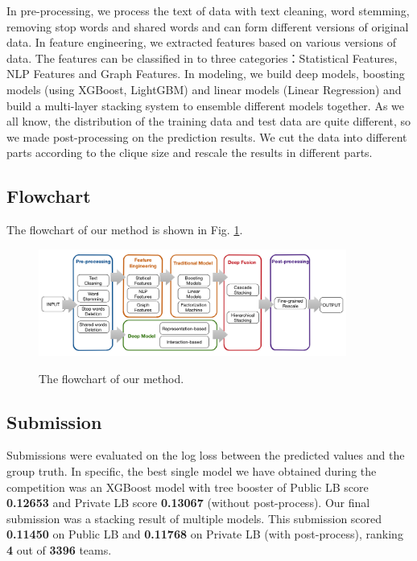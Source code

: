 \documentclass[12pt]{article}
\begin{document}
In pre-processing, we process the text of data with text cleaning, word stemming, removing stop words and shared words and can form different versions of original data. In feature engineering, we extracted features based on various versions of data. The features can be classified in to three categories：Statistical Features, NLP Features and Graph Features. In modeling, we build deep models, boosting models (using XGBoost, LightGBM) and linear models (Linear Regression) and build a multi-layer stacking system to ensemble different models together. As we all know, the distribution of the training data and test data are quite different, so we made post-processing on the prediction results. We cut the data into different parts according to the clique size and rescale the results in different parts. 

\subsection{Flowchart}

The flowchart of our method is shown in Fig. \ref{fig:Flowchart}.

\begin{figure}[ht]
  \centering
  \includegraphics[width=0.9\textwidth]{../img/flowchart}\\
  \caption{The flowchart of our method.}
  \label{fig:Flowchart}
\end{figure}

\subsection{Submission}
\label{subsec:Results_description}

Submissions were evaluated on the log loss between the predicted values and the group truth. In specific, the best single model we have obtained during the competition was an XGBoost model with tree booster of Public LB score \textbf{0.12653} and Private LB score \textbf{0.13067} (without post-process). Our final submission was a stacking result of multiple models. This submission scored \textbf{0.11450} on Public LB and \textbf{0.11768} on Private LB (with post-process), ranking \textbf{4} out of \textbf{3396} teams.
\end{document}
